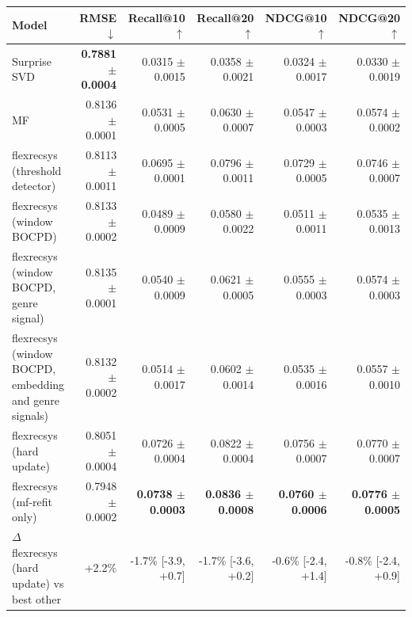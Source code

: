 \begin{tabular}{lrrrrr}
\toprule
Model & RMSE $\downarrow$ & Recall@10 $\uparrow$ & Recall@20 $\uparrow$ & NDCG@10 $\uparrow$ & NDCG@20 $\uparrow$ \\
\midrule
Surprise SVD & \textbf{0.7881 $\pm$ 0.0004} & 0.0315 $\pm$ 0.0015 & 0.0358 $\pm$ 0.0021 & 0.0324 $\pm$ 0.0017 & 0.0330 $\pm$ 0.0019 \\
MF & 0.8136 $\pm$ 0.0001 & 0.0531 $\pm$ 0.0005 & 0.0630 $\pm$ 0.0007 & 0.0547 $\pm$ 0.0003 & 0.0574 $\pm$ 0.0002 \\
flexrecsys (threshold detector) & 0.8113 $\pm$ 0.0011 & 0.0695 $\pm$ 0.0001 & 0.0796 $\pm$ 0.0011 & 0.0729 $\pm$ 0.0005 & 0.0746 $\pm$ 0.0007 \\
flexrecsys (window BOCPD) & 0.8133 $\pm$ 0.0002 & 0.0489 $\pm$ 0.0009 & 0.0580 $\pm$ 0.0022 & 0.0511 $\pm$ 0.0011 & 0.0535 $\pm$ 0.0013 \\
flexrecsys (window BOCPD, genre signal) & 0.8135 $\pm$ 0.0001 & 0.0540 $\pm$ 0.0009 & 0.0621 $\pm$ 0.0005 & 0.0555 $\pm$ 0.0003 & 0.0574 $\pm$ 0.0003 \\
flexrecsys (window BOCPD, embedding and genre signals) & 0.8132 $\pm$ 0.0002 & 0.0514 $\pm$ 0.0017 & 0.0602 $\pm$ 0.0014 & 0.0535 $\pm$ 0.0016 & 0.0557 $\pm$ 0.0010 \\
flexrecsys (hard update) & 0.8051 $\pm$ 0.0004 & 0.0726 $\pm$ 0.0004 & 0.0822 $\pm$ 0.0004 & 0.0756 $\pm$ 0.0007 & 0.0770 $\pm$ 0.0007 \\
flexrecsys (mf-refit only) & 0.7948 $\pm$ 0.0002 & \textbf{0.0738 $\pm$ 0.0003} & \textbf{0.0836 $\pm$ 0.0008} & \textbf{0.0760 $\pm$ 0.0006} & \textbf{0.0776 $\pm$ 0.0005} \\
\midrule
$\Delta$ flexrecsys (hard update) vs best other & +2.2\% & -1.7\% [-3.9, +0.7] & -1.7\% [-3.6, +0.2] & -0.6\% [-2.4, +1.4] & -0.8\% [-2.4, +0.9] \\
\bottomrule
\end{tabular}
